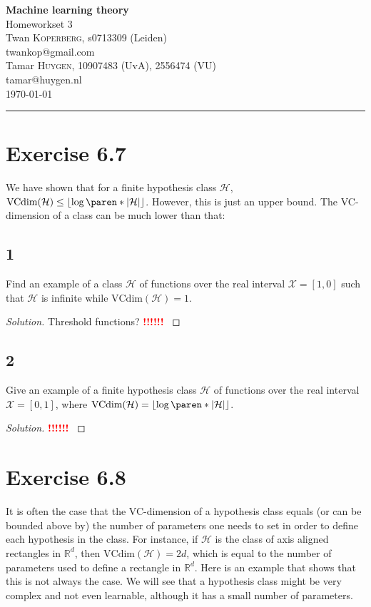 \documentclass[10pt, a4paper, twoside]{amsart}
\makeatletter
\newcommand{\R}{\ensuremath{\mathbb{R}}}
\DeclarePairedDelimiter\abs{\lvert}{\rvert}
\DeclarePairedDelimiter\paren()
\newcommand{\cH}{\ensuremath{\mathcal{H}}}
\newcommand{\cX}{\ensuremath{\mathcal{X}}}
\newenvironment{solution}
               {\let\oldqedsymbol=\qedsymbol
                \renewcommand{\qedsymbol}{$\blacktriangleleft$}
                \begin{proof}[Solution]}
               {\end{proof}
                \renewcommand{\qedsymbol}{\oldqedsymbol}}
\newcommand{\TODO}{\textcolor{red}{\textbf{!!!!!! }}}
\newcommand{\firstName}  {Twan}
\newcommand{\lastName}   {Koperberg}
\newcommand{\studId}     {0713309 (Leiden)}
\renewcommand{\email}    {twankop@gmail.com}
\newcommand{\firstNameII}  {Tamar}
\newcommand{\lastNameII}   {Huygen}
\newcommand{\studIdII}     {10907483 (UvA)}
\newcommand{\studIdIII}    {2556474 (VU)}
\newcommand{\emailII}     {tamar@huygen.nl}
\makeatother
\begin{document}
\begin{center}

  {\huge\bf Machine learning theory}\\
  {\large\sc Homeworkset 3 }\\ \vspace{1em}
  \firstName \textsc{ \lastName}, {\sc s}\studId \\
  \email\text{}\\ \smallskip
  \firstNameII \textsc{ \lastNameII}, \studIdII, \studIdIII\\
  \emailII \\ \bigskip
  \today \\\bigskip
  \hrule
  \bigskip
 \end{center}

 \section*{Exercise 6.7}
 We have shown that for a finite hypothesis class $\cH$, $\text{VCdim}(\cH) \leq \left\lfloor \log \paren*{\abs{\cH}} \right\rfloor$. However, this is just an upper bound. The VC-dimension of a class can be much lower than that:
 \subsection*{1}
 Find an example of a class $\cH$ of functions over the real interval $\cX = [1,0]$ such that $\cH$ is infinite while $\text{VCdim}(\cH) = 1$.
 \begin{solution}
   Threshold functions?
 \TODO
\end{solution}
\subsection*{2}
Give an example of a finite hypothesis class $\cH$ of functions over the real interval $\cX = [0,1]$, where $\text{VCdim}(\cH) = \left\lfloor \log \paren*{\abs{\cH}} \right\rfloor$.
\begin{solution}
  
 \TODO
\end{solution}
\section*{Exercise 6.8}
It is often the case that the VC-dimension of a hypothesis class equals (or can be bounded above by) the number of parameters one needs to set in order to define each hypothesis in the class. For instance, if $\cH$ is the class of axis aligned rectangles in $\R^d$, then $\text{VCdim}(\cH) = 2d$, which is equal to the number of parameters used to define a rectangle in $\R^d$. Here is an example that shows that this is not always the case. We will see that a hypothesis class might be very complex and not even learnable, although it has a small number of parameters.
\end{document}
